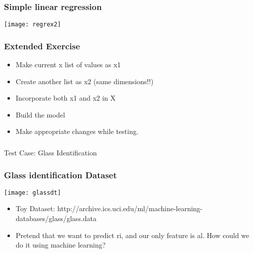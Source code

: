 \begin{frame}[fragile]\frametitle{Simple linear regression}
\begin{center}
\texttt{[image: regrex2]}
\end{center}
\end{frame}

\begin{frame}[fragile]\frametitle{Extended Exercise}
\begin{itemize}
\item Make current x list of values as x1
\item Create another list as x2 (same dimensions!!)
\item Incorporate both x1 and x2 in X
\item Build the model
\item Make appropriate changes while testing.
\end{itemize}
\end{frame}


%
%
%
%


\begin{frame}[fragile]\frametitle{}
\begin{center}
{\Large Test Case: Glass Identification }
\end{center}
\end{frame}

\begin{frame}[fragile]\frametitle{Glass identification Dataset}

\begin{center}
\texttt{[image: glassdt]}
\end{center}


\begin{itemize}
\item Toy Dataset:  http://archive.ics.uci.edu/ml/machine-learning-databases/glass/glass.data
\item  Pretend that we want to predict ri, and our only feature is al. How could we do it using machine learning?
\end{itemize}

\end{frame}



